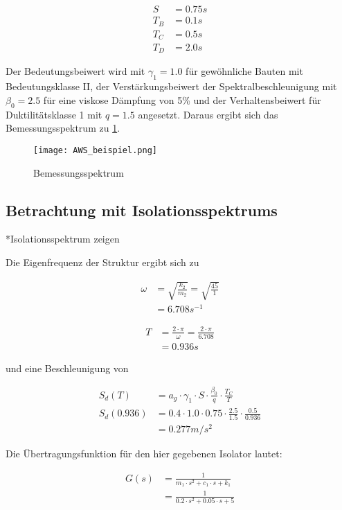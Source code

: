 \begin{align*}
S &= 0.75 s\\
T_B &= 0.1 s\\
T_C &= 0.5 s\\
T_D &= 2.0 s
\end{align*}

Der Bedeutungsbeiwert wird mit $\gamma_1 = 1.0$ für gewöhnliche Bauten mit Bedeutungsklasse II, der Verstärkungsbeiwert der Spektralbeschleunigung mit $\beta_0 = 2.5$ für eine viskose Dämpfung von 5\% und der Verhaltensbeiwert für Duktilitätsklasse 1 mit $q = 1.5$ angesetzt.
Daraus ergibt sich das Bemessungsspektrum zu \cref{fig:Bemessungsspektrum}.

\begin{figure}[ht] 
    \centering
    \texttt{[image: AWS\_beispiel.png]}
    \caption{Bemessungsspektrum}
    \label{fig:Bemessungsspektrum}
\end{figure}

\subsection{Betrachtung mit Isolationsspektrums}

*Isolationsspektrum zeigen

Die Eigenfrequenz der Struktur ergibt sich zu

\begin{align*}
\omega &= \sqrt{\frac{k_2}{m_2}} = \sqrt{\frac{45}{1}}\\
       &= 6.708 s^{-1}
\end{align*}

\begin{align*}
T &= \frac{2 \cdot \pi}{\omega} = \frac{2 \cdot \pi}{6.708}\\
  &= 0.936 s
\end{align*}

und eine Beschleunigung von

\begin{align*}
S_d(T) &= a_g \cdot \gamma_1 \cdot S \cdot \frac{\beta_0}{q} \cdot \frac{T_C}{T}\\
S_d(0.936) &= 0.4 \cdot 1.0 \cdot 0.75 \cdot \frac{2.5}{1.5} \cdot \frac{0.5}{0.936}\\
           &= 0.277 m/s^2
\end{align*}

Die Übertragungsfunktion für den hier gegebenen Isolator lautet:

\begin{align*}
G(s) &= \frac{1}{m_1 \cdot s^2 + c_1 \cdot s + k_1}\\
     &= \frac{1}{0.2 \cdot s^2 + 0.05 \cdot s + 5}
\end{align*}

